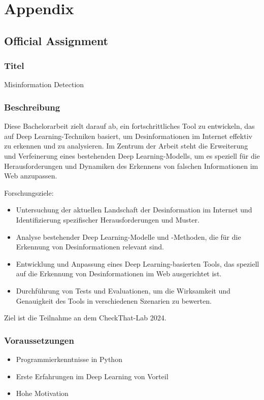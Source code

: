 \newpage
\section{Appendix}
\subsection{Official Assignment} \label{offassignment}
\subsubsection*{\textbf{Titel}}
Misinformation Detection
\subsubsection*{\textbf{Beschreibung}} \label{offassignment_description}
Diese Bachelorarbeit zielt darauf ab, ein fortschrittliches Tool zu entwickeln, das auf Deep Learning-Techniken basiert, um Desinformationen im Internet effektiv zu erkennen und zu analysieren. Im Zentrum der Arbeit steht die Erweiterung und Verfeinerung eines bestehenden Deep Learning-Modells, um es speziell für die Herausforderungen und Dynamiken des Erkennens von falschen Informationen im Web anzupassen.

Forschungsziele:
\begin{itemize}
    \item Untersuchung der aktuellen Landschaft der Desinformation im Internet und Identifizierung spezifischer Herausforderungen und Muster.
    \item Analyse bestehender Deep Learning-Modelle und -Methoden, die für die Erkennung von Desinformationen relevant sind.
    \item Entwicklung und Anpassung eines Deep Learning-basierten Tools, das speziell auf die Erkennung von Desinformationen im Web ausgerichtet ist.
    \item Durchführung von Tests und Evaluationen, um die Wirksamkeit und Genauigkeit des Tools in verschiedenen Szenarien zu bewerten.
\end{itemize}

Ziel ist die Teilnahme an dem CheckThat-Lab 2024.

\subsubsection*{\textbf{Voraussetzungen}}
\begin{itemize}
    \item Programmierkenntnisse in Python
    \item Erste Erfahrungen im Deep Learning von Vorteil
    \item Hohe Motivation
\end{itemize}




